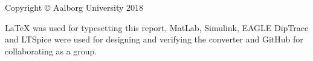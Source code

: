 \thispagestyle{empty}
{\small
\strut\vfill %
\noindent Copyright \copyright{} Aalborg University 2018\par
\vspace{0.2cm}
\noindent \LaTeX \: was used for typesetting this report,
MatLab, Simulink, EAGLE DipTrace and LTSpice were used for designing and verifying the converter and
GitHub \cite{GitHub} for collaborating as a group.
}
\clearpage